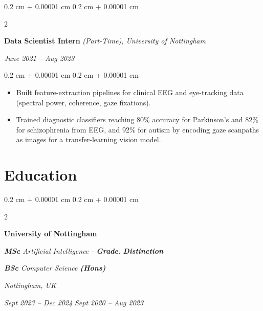 \documentclass[10.5pt, letterpaper]{article}
\newenvironment{highlights}{
    \begin{itemize}[
        topsep=0.03cm, %
        parsep=0.03cm, %
        partopsep=0pt, %
        itemsep=0.08cm, %
        leftmargin=0.4cm %
    ]
}{
    \end{itemize}
}
\newenvironment{onecolentry}{
    \begin{adjustwidth}{
        0.2 cm + 0.00001 cm
    }{
        0.2 cm + 0.00001 cm
    }
}{
    \end{adjustwidth}
} %
\newenvironment{twocolentry}[2][]{
    \onecolentry
    \def\secondColumn{#2}
    \setcolumnwidth{\fill, 4.5 cm}
    \begin{paracol}{2}
}{
    \switchcolumn \raggedleft \secondColumn
    \end{paracol}
    \endonecolentry
} %
\begin{document}
        
\vspace{0.25 cm}
        \begin{twocolentry}{
        \textit{June 2021 – Aug 2023}}
            \textbf{Data Scientist Intern} \textit{(Part-Time), University of Nottingham}
        \end{twocolentry}
\vspace{0.06 cm}
        
        \begin{onecolentry}
            \begin{highlights}
                \item Built feature-extraction pipelines for clinical EEG and eye-tracking data (spectral power, coherence, gaze fixations).
                \item Trained diagnostic classifiers reaching 80\% accuracy for Parkinson's and 82\% for schizophrenia from EEG, and 92\% for autism by encoding gaze scanpaths as images for a transfer-learning vision model.
            \end{highlights}
        \end{onecolentry}  

\section{Education}
\begin{twocolentry}{
    \textit{Nottingham, UK}   
    
    \textit{Sept 2023 – Dec 2024}
    \textit{Sept 2020 – Aug 2023}}
    \textbf{University of Nottingham}

    \textit{\textbf{MSc} Artificial Intelligence - \textbf{Grade}: \textbf{Distinction}}

    \textit{\textbf{BSc} Computer Science \textbf{(Hons)}}
\end{twocolentry}
\end{document}

